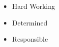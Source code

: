 \twocolumnsection
{
\begin{skills}
\end{skills}}
{
\vspace{1em}
\begin{itemize}
  \item Hard Working
	\item Determined                    
  \item Responsible
\end{itemize}
}

